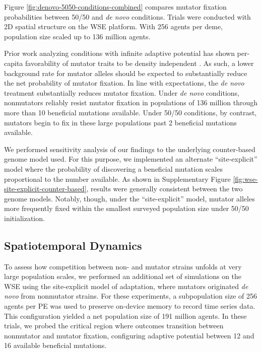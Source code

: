 Figure \ref{fig:denovo-5050-conditions-combined} compares mutator fixation probabilities between 50/50 and \textit{de novo} conditions.
Trials were conducted with 2D spatial structure on the WSE platform.
With 256 agents per deme, population size scaled up to 136 million agents.

Prior work analyzing conditions with infinite adaptive potential has shown per-capita favorability of mutator traits to be density independent \citep{raynes2019selection}.
As such, a lower background rate for mutator alleles should be expected to substantially reduce the net probability of mutator fixation.
In line with expectations, the \textit{de novo} treatment substantially reduces mutator fixation.
Under \textit{de novo} conditions, nonmutators reliably resist mutator fixation in populations of 136 million through more than 10 beneficial mutations available.
Under 50/50 conditions, by contrast, mutators begin to fix in these large populations past 2 beneficial mutations available.

We performed sensitivity analysis of our findings to the underlying counter-based genome model used.
For this purpose, we implemented an alternate ``site-explicit'' model where the probability of discovering a beneficial mutation scales proportional to the number available.
As shown in Supplementary Figure \ref{fig:wse-site-explicit-counter-based}, results were generally consistent between the two genome models.
Notably, though, under the ``site-explicit'' model, mutator alleles more frequently fixed within the smallest surveyed population size under 50/50 initialization.

\subsection{Spatiotemporal Dynamics}
\label{sec:dynamics}

To assess how competition between non- and mutator strains unfolds at very large population scales, we performed an additional set of simulations on the WSE using the site-explicit model of adaptation, where mutators originated \textit{de novo} from nonmutator strains.
For these experiments, a subpopulation size of 256 agents per PE was used to preserve on-device memory to record time series data.
This configuration yielded a net population size of 191 million agents.
In these trials, we probed the critical region where outcomes transition between nonmutator and mutator fixation, configuring adaptive potential between 12 and 16 available beneficial mutations.

